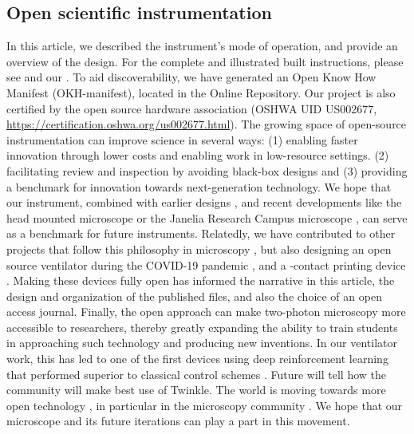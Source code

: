 \documentclass[10pt,letterpaper]{article}
\begin{document}
\subsection*{Open scientific instrumentation}
In this article, we described the instrument's mode of operation, and provide an overview of the design. For the complete and illustrated built instructions, please see  and our . To aid discoverability, we have generated an Open Know How Manifest (OKH-manifest), located in the Online Repository. Our project is also certified by the open source hardware association (OSHWA UID
US002677, \url{https://certification.oshwa.org/us002677.html}).\newline
The growing space of open-source instrumentation can improve science in several ways: (1) enabling faster innovation through lower costs and enabling work in low-resource settings. (2) facilitating review and inspection by avoiding black-box designs and (3) providing a benchmark for innovation towards next-generation technology. We hope that our instrument, combined with earlier designs \cite{Rosenegger2014, Mayrhofer2015, Tan1999}, and recent developments like the head mounted microscope \cite{Zong2022} or the Janelia Research Campus microscope \cite{Janelia2024}, can serve as a benchmark for future instruments. Relatedly, we have contributed to other projects that follow this philosophy in microscopy \cite{Scott2018}, but also designing an open source ventilator during the COVID-19 pandemic \cite{LaChance2022,POVMC2022}, and a \textmu-contact printing device \cite{Samhaber2016}. Making these devices fully open has informed the narrative in this article, the design and organization of the published files, and also the choice of an open access journal. Finally, the open approach can make two-photon microscopy more accessible to researchers, thereby greatly expanding the ability to train students in approaching such technology and producing new inventions. In our ventilator work, this has led to one of the first devices using deep reinforcement learning that performed superior to classical control schemes \cite{Suo2021}. Future will tell how the community will make best use of Twinkle. The world is moving towards more open technology \cite{Schottdorf2024}, in particular in the microscopy community \cite{Hohlbein2022}. We hope that our microscope and its future iterations can play a part in this movement.
\end{document}
